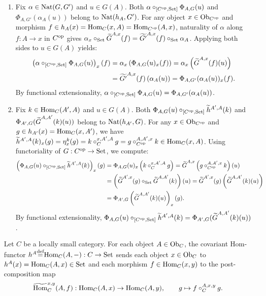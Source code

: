 \documentclass[10pt,a4paper]{article}
\begin{document}
\begin{enumerate}
\item Fix $\alpha \in {\textrm{Nat}}(G, G')$ and $u \in G(A)$. Both $\alpha \circ_{[C^{\textrm{op}},{\textrm{Set}}]} \Phi_{A,G}(u)$ and $\Phi_{A,G'}(\alpha_A(u))$ belong to ${\textrm{Nat}}(h_A, G')$. For any object $x \in {\textrm{Ob}}_{C^{\textrm{op}}}$ and morphism $f \in h_A(x) = {\textrm{Hom}}_C(x,A) = {\textrm{Hom}}_{C^{\textrm{op}}}(A,x)$, naturality of $\alpha$ along $f : A \to x$ in $C^{\textrm{op}}$ gives $\alpha_x \circ_{\textrm{Set}} {\widetilde{G}\textrm{}}^{A,x}(f) = \widetilde{G'}^{A,x}(f) \circ_{\textrm{Set}} \alpha_A$. Applying both sides to $u \in G(A)$ yields:
\begin{align*}
\left(\alpha \circ_{[C^{\textrm{op}},{\textrm{Set}}]} \Phi_{A,G}(u)\right)_x(f) &= \alpha_x\left(\Phi_{A,G}(u)_x(f)\right) = \alpha_x\left({\widetilde{G}\textrm{}}^{A,x}(f)(u)\right) \\
&= \widetilde{G'}^{A,x}(f)\left(\alpha_A(u)\right) = \Phi_{A,G'}(\alpha_A(u))_x(f).
\end{align*}
By functional extensionality, $\alpha \circ_{[C^{\textrm{op}},{\textrm{Set}}]} \Phi_{A,G}(u) = \Phi_{A,G'}(\alpha_A(u))$.

\item Fix $k \in {\textrm{Hom}}_C(A', A)$ and $u \in G(A)$. Both $\Phi_{A,G}(u) \circ_{[C^{\textrm{op}},{\textrm{Set}}]} \widetilde{h}^{A',A}(k)$ and $\Phi_{A',G}({\widetilde{G}\textrm{}}^{A,A'}(k)(u))$ belong to ${\textrm{Nat}}(h_{A'}, G)$. For any $x \in {\textrm{Ob}}_{C^{\textrm{op}}}$ and $g \in h_{A'}(x) = {\textrm{Hom}}_C(x, A')$, we have $\widetilde{h}^{A',A}(k)_x(g) = \eta^k_x(g) = k \circ_C^{x,A',A} g = g \circ_{C^{\textrm{op}}}^{A,A',x} k \in {\textrm{Hom}}_C(x,A)$. Using functoriality of $G : C^{\textrm{op}} \to {\textrm{Set}}$, we compute:
\begin{align*}
\left(\Phi_{A,G}(u) \circ_{[C^{\textrm{op}},{\textrm{Set}}]} \widetilde{h}^{A',A}(k)\right)_x(g) &= \Phi_{A,G}(u)_x\left(k \circ_C^{x,A',A} g\right) = {\widetilde{G}\textrm{}}^{A,x}\left(g \circ_{C^{\textrm{op}}}^{A,A',x} k\right)(u) \\
&= \left({\widetilde{G}\textrm{}}^{A',x}(g) \circ_{\textrm{Set}} {\widetilde{G}\textrm{}}^{A,A'}(k)\right)(u) = {\widetilde{G}\textrm{}}^{A',x}(g)\left({\widetilde{G}\textrm{}}^{A,A'}(k)(u)\right) \\
&= \Phi_{A',G}\left({\widetilde{G}\textrm{}}^{A,A'}(k)(u)\right)_x(g).
\end{align*}
By functional extensionality, $\Phi_{A,G}(u) \circ_{[C^{\textrm{op}},{\textrm{Set}}]} \widetilde{h}^{A',A}(k) = \Phi_{A',G}({\widetilde{G}\textrm{}}^{A,A'}(k)(u))$.
\end{enumerate}
\myqed

\begin{definition}
Let $C$ be a locally small category. For each object $A \in {\textrm{Ob}}_C$, the covariant Hom-functor $h^A {\stackrel{{\textrm{def}}}{=}} {\textrm{Hom}}_C(A, -) : C \to {\textrm{Set}}$ sends each object $x \in {\textrm{Ob}}_C$ to $h^A(x) = {\textrm{Hom}}_C(A,x) \in {\textrm{Set}}$ and each morphism $f \in {\textrm{Hom}}_C(x,y)$ to the post-composition map
$${\widetilde{{\textrm{Hom}}}\textrm{}}_C^{x,y}(A, f) : {\textrm{Hom}}_C(A,x) \to {\textrm{Hom}}_C(A,y), \qquad g \mapsto f \circ_C^{A,x,y} g.$$
\end{definition}
\end{document}
